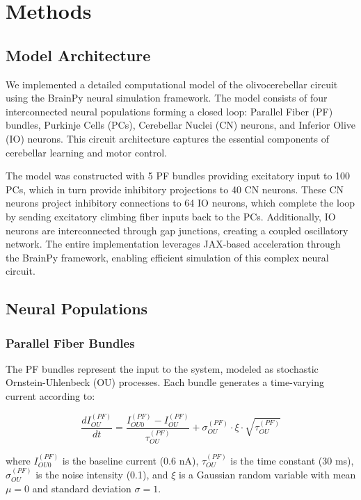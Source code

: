 \section{Methods}

\subsection{Model Architecture}

We implemented a detailed computational model of the olivocerebellar circuit using the BrainPy neural simulation framework. The model consists of four interconnected neural populations forming a closed loop: Parallel Fiber (PF) bundles, Purkinje Cells (PCs), Cerebellar Nuclei (CN) neurons, and Inferior Olive (IO) neurons. This circuit architecture captures the essential components of cerebellar learning and motor control.

The model was constructed with 5 PF bundles providing excitatory input to 100 PCs, which in turn provide inhibitory projections to 40 CN neurons. These CN neurons project inhibitory connections to 64 IO neurons, which complete the loop by sending excitatory climbing fiber inputs back to the PCs. Additionally, IO neurons are interconnected through gap junctions, creating a coupled oscillatory network. The entire implementation leverages JAX-based acceleration through the BrainPy framework, enabling efficient simulation of this complex neural circuit.

\subsection{Neural Populations}

\subsubsection{Parallel Fiber Bundles}

The PF bundles represent the input to the system, modeled as stochastic Ornstein-Uhlenbeck (OU) processes. Each bundle generates a time-varying current according to:

\begin{equation}
\frac{dI^{(PF)}_{OU}}{dt} = \frac{I^{(PF)}_{OU0} - I^{(PF)}_{OU}}{\tau^{(PF)}_{OU}} + \sigma^{(PF)}_{OU} \cdot \xi \cdot \sqrt{\tau^{(PF)}_{OU}}
\end{equation}

where $I^{(PF)}_{OU0}$ is the baseline current (0.6 nA), $\tau^{(PF)}_{OU}$ is the time constant (30 ms), $\sigma^{(PF)}_{OU}$ is the noise intensity (0.1), and $\xi$ is a Gaussian random variable with mean $\mu = 0$ and standard deviation $\sigma = 1$.

